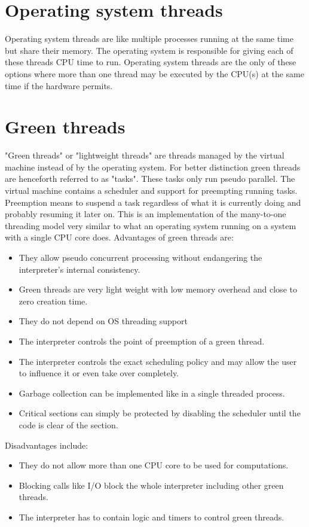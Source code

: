 \documentclass[bachelor,english]{hgbthesis}
\begin{document}
\section{Operating system threads}

Operating system threads are like multiple processes running at the same time but share their memory. The operating system is responsible for giving each of these threads CPU time to run. Operating system threads are the only of these options where more than one thread may be executed by the CPU(s) at the same time if the hardware permits.

\section {Green threads}

"Green threads" or "lightweight threads" are threads managed by the virtual machine instead of by the operating system. For better distinction green threads are henceforth referred to as "tasks". These tasks only run pseudo parallel. The virtual machine contains a scheduler and support for preempting running tasks.
Preemption means to suspend a task regardless of what it is currently doing and probably resuming it later on.
This is an implementation of the many-to-one threading model very similar to what an operating system running on a system with a single CPU core does.
%
Advantages of green threads are:
%
\begin{itemize}
\item They allow pseudo concurrent processing without endangering the interpreter's internal consistency.
\item Green threads are very light weight with low memory overhead and close to zero creation time.
\item They do not depend on OS threading support
\item The interpreter controls the point of preemption of a green thread.
\item The interpreter controls the exact scheduling policy and may allow the user to influence it or even take over completely.
\item Garbage collection can be implemented like in a single threaded process.
\item Critical sections can simply be protected by disabling the scheduler until the code is clear of the section.
\end{itemize}
%
Disadvantages include:
%
\begin{itemize}
\item They do not allow more than one CPU core to be used for computations.
\item Blocking calls like I/O block the whole interpreter including other green threads.
\item The interpreter has to contain logic and timers to control green threads.
\end{itemize}
\end{document}
